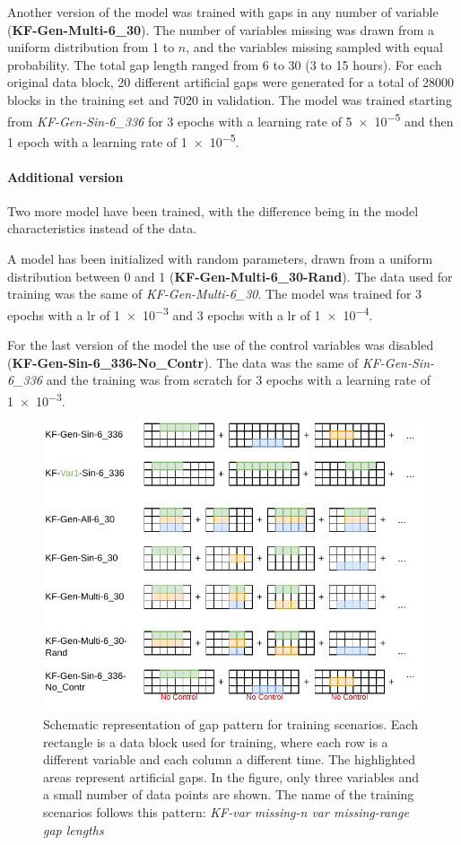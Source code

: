 \documentclass{article}
\begin{document}
Another version of the model was trained with gaps in any number of variable (\textbf{KF-Gen-Multi-6\_30}). The number of variables missing was drawn from a uniform distribution  from 1 to $n$, and the variables missing sampled with equal probability. The total gap length ranged from 6 to 30 (3 to 15 hours). For each original data block, 20 different artificial gaps were generated for a total of 28000 blocks in the training set and 7020 in validation. The model was trained starting from \textit{KF-Gen-Sin-6\_336} for 3 epochs with a learning rate of \num{5e-5} and then 1 epoch with a learning rate of \num{1e-5}.

\paragraph{Additional version} Two more model have been trained, with the difference being in the model characteristics instead of the data.

A model has been initialized with random parameters, drawn from a uniform distribution between 0 and 1 (\textbf{KF-Gen-Multi-6\_30-Rand}). The data used for training was the same of  \textit{KF-Gen-Multi-6\_30}. The model was trained for 3 epochs with a lr of \num{1e-3} and 3 epochs with a lr of \num{1e-4}.

For the last version of the model the use of the control variables was disabled (\textbf{KF-Gen-Sin-6\_336-No\_Contr}). The data was the same of \textit{KF-Gen-Sin-6\_336} and the training was from scratch for \num{3} epochs with a learning rate of \num{1e-3}.

\begin{figure}
\centerline{\includegraphics[width=\textwidth]{training scenarios}}
\caption{Schematic representation of gap pattern for training scenarios. Each rectangle is a data block used for training, where each row is a different variable and each column a different time. The highlighted areas represent artificial gaps. In the figure, only three variables and a small number of data points are shown. The name of the training scenarios follows this pattern: \textit{KF-\textlangle var missing\textrangle-\textlangle n var missing\textrangle-\textlangle range gap lengths }}
\label{fig:training}
\end{figure}
\end{document}
